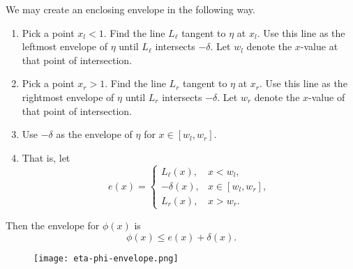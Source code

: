 \documentclass[12pt]{article}
\newcommand{\JJ}{\text{J}^*}
\begin{document}
We may create an enclosing envelope in the following way.
\begin{enumerate}
\item Pick a point $x_l < 1$.  Find the line $L_\ell$ tangent to $\eta$ at
  $x_l$.  Use this line as the leftmost envelope of $\eta$ until $L_\ell$
  intersects $-\delta$.  Let $w_l$ denote the $x$-value at that point of
  intersection.
\item Pick a point $x_r > 1$.  Find the line $L_r$ tangent to $\eta$ at $x_r$.
  Use this line as the rightmost envelope of $\eta$ until $L_r$ intersects
  $-\delta$.  Let $w_r$ denote the $x$-value of that point of intersection.
\item Use $-\delta$ as the envelope of $\eta$ for $x \in [w_l, w_r]$.
\item That is, let
\[
e(x) = 
\begin{cases}
L_\ell(x), & x < w_l, \\
-\delta(x), & x \in [w_l, w_r], \\
L_r(x), & x > w_r.
\end{cases}
\]
\end{enumerate}
Then the envelope for $\phi(x)$ is
\[
\phi(x) \leq e(x) + \delta(x).
\]

\begin{figure}
\centering
\texttt{[image: eta-phi-envelope.png]}
\end{figure}





{}
\end{document}
